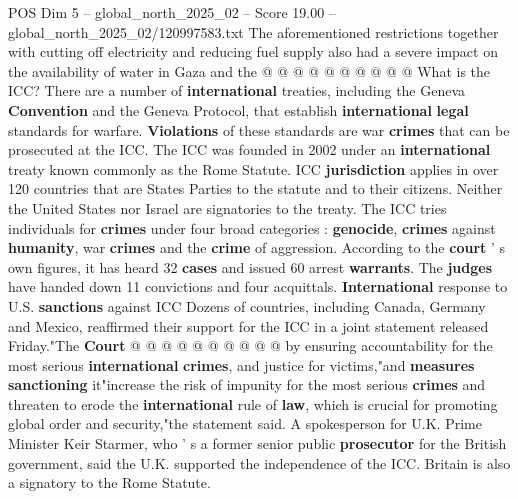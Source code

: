 \begin{textsample}{POS Dim 5 – global\_north\_2025\_02 – Score 19.00 – global\_north\_2025\_02/120997583.txt}
The aforementioned restrictions together with cutting off electricity and reducing fuel supply also had a severe impact on the availability of water in Gaza and the @ @ @ @ @ @ @ @ @ @ What is the ICC?
There are a number of \textbf{international} treaties, including the Geneva \textbf{Convention} and the Geneva Protocol, that establish \textbf{international} \textbf{legal} standards for warfare. \textbf{Violations} of these standards are war \textbf{crimes} that can be prosecuted at the ICC.
The ICC was founded in 2002 under an \textbf{international} treaty known commonly as the Rome Statute.
ICC \textbf{jurisdiction} applies in over 120 countries that are States Parties to the statute and to their citizens.
Neither the United States nor Israel are signatories to the treaty.
The ICC tries individuals for \textbf{crimes} under four broad categories : \textbf{genocide}, \textbf{crimes} against \textbf{humanity}, war \textbf{crimes} and the \textbf{crime} of aggression.
According to the \textbf{court} ' s own figures, it has heard 32 \textbf{cases} and issued 60 arrest \textbf{warrants}.
The \textbf{judges} have handed down 11 convictions and four acquittals. \textbf{International} response to U.S. \textbf{sanctions} against ICC Dozens of countries, including Canada, Germany and Mexico, reaffirmed their support for the ICC in a joint statement released Friday."The \textbf{Court} @ @ @ @ @ @ @ @ @ @ by ensuring accountability for the most serious \textbf{international} \textbf{crimes}, and justice for victims,"and \textbf{measures} \textbf{sanctioning} it"increase the risk of impunity for the most serious \textbf{crimes} and threaten to erode the \textbf{international} rule of \textbf{law}, which is crucial for promoting global order and security,"the statement said.
A spokesperson for U.K.
Prime Minister Keir Starmer, who ' s a former senior public \textbf{prosecutor} for the British government, said the U.K. supported the independence of the ICC.
Britain is also a signatory to the Rome Statute.

\end{textsample}
